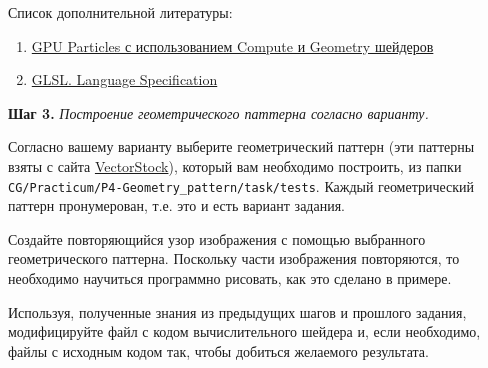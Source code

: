 \documentclass[a4paper,12pt]{article}
\begin{document}
    Список дополнительной литературы:
    \begin{enumerate}
        \item \href{https://habr.com/ru/articles/248755/}{GPU Particles с использованием Compute и Geometry шейдеров}
        \item \href{https://www.khronos.org/registry/OpenGL/specs/gl/}{GLSL. Language Specification}
    \end{enumerate}
    
    \textbf{Шаг 3.} \textit{Построение геометрического паттерна согласно варианту.}
    
    Согласно вашему варианту выберите геометрический паттерн (эти паттерны взяты с сайта \href{https://www.vectorstock.com}{VectorStock}), который вам необходимо построить, из папки 
     \texttt{CG/Practicum/P4-Geometry\_pattern/task/tests}. 
    Каждый геометрический паттерн пронумерован, т.е. это и есть вариант задания.
    
    Создайте повторяющийся узор изображения с помощью выбранного геометрического паттерна. Поскольку части изображения повторяются, то необходимо научиться программно рисовать, как это сделано в примере.
    
    Используя, полученные знания из предыдущих шагов и прошлого задания, модифицируйте файл с кодом вычислительного шейдера и, если необходимо, файлы с исходным кодом так, чтобы добиться желаемого результата.
    
\end{document}
